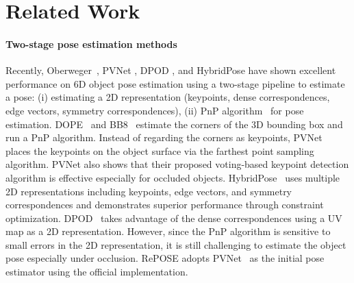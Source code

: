 \documentclass[10pt,twocolumn,letterpaper]{article}
\begin{document}
\section{Related Work}
\label{sec:related_work}
\paragraph{Two-stage pose estimation methods}

Recently, Oberweger~\cite{Oberweger_2018_ECCV}, PVNet \cite{peng2019pvnet}, DPOD \cite{Zakharov_2019_ICCV}, and HybridPose \cite{Song_2020_CVPR} have shown excellent performance on 6D object pose estimation using a two-stage pipeline to estimate a pose: (i) estimating a 2D representation (\eg keypoints, dense correspondences, edge vectors, symmetry correspondences), (ii) PnP algorithm~\cite{10.1007/s11263-008-0152-6,BPnP2020} for pose estimation. DOPE~\cite{tremblay2018corl:dope} and BB8~\cite{DBLP:journals/corr/RadL17} estimate the corners of the 3D bounding box and run a PnP algorithm. Instead of regarding the corners as keypoints, PVNet~\cite{peng2019pvnet} places the keypoints on the object surface via the farthest point sampling algorithm. PVNet also shows that their proposed voting-based keypoint detection algorithm is effective especially for occluded objects. HybridPose~\cite{Song_2020_CVPR} uses multiple 2D representations including keypoints, edge vectors, and symmetry correspondences and demonstrates superior performance through constraint optimization.
DPOD~\cite{Zakharov_2019_ICCV} takes advantage of the dense correspondences using a UV map as a 2D representation. However, since the PnP algorithm is sensitive to small errors in the 2D representation, it is still challenging to estimate the object pose especially under occlusion. RePOSE adopts PVNet~\cite{peng2019pvnet} as the initial pose estimator using the official implementation.
\end{document}
